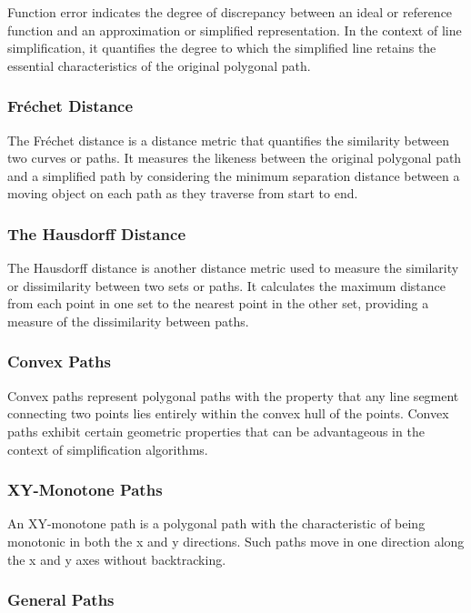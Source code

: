 \documentclass[twoside,12pt, a4paper]{report}
\begin{document}
Function error indicates the degree of discrepancy between an ideal or reference function and an approximation or simplified representation. In the context of line simplification, it quantifies the degree to which the simplified line retains the essential characteristics of the original polygonal path.

\subsubsection{Fréchet Distance} 

The Fréchet distance is a distance metric that quantifies the similarity between two curves or paths. It measures the likeness between the original polygonal path and a simplified path by considering the minimum separation distance between a moving object on each path as they traverse from start to end.


\subsubsection{The Hausdorff Distance} 

The Hausdorff distance is another distance metric used to measure the similarity or dissimilarity between two sets or paths. It calculates the maximum distance from each point in one set to the nearest point in the other set, providing a measure of the dissimilarity between paths.


\subsubsection{Convex Paths} 

Convex paths represent polygonal paths with the property that any line segment connecting two points lies entirely within the convex hull of the points. Convex paths exhibit certain geometric properties that can be advantageous in the context of simplification algorithms.

\subsubsection{XY-Monotone Paths} 

An XY-monotone path is a polygonal path with the characteristic of being monotonic in both the x and y directions. Such paths move in one direction along the x and y axes without backtracking.

\subsubsection{General Paths} 
\end{document}
